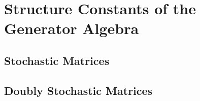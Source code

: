 \section{Structure Constants of the Generator Algebra}
\subsection{Stochastic Matrices}
\subsection{Doubly Stochastic Matrices}